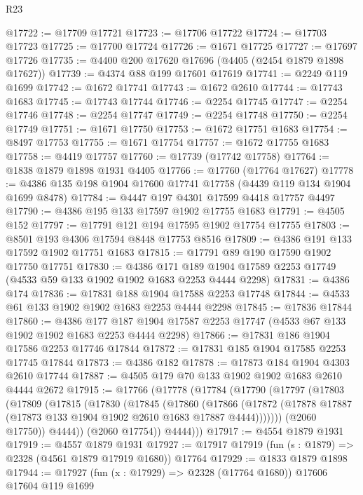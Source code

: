 \begin{lexlean}{R23}
\begin{coremodule}
@17722 := @17709 @17721
@17723 := @17706 @17722
@17724 := @17703 @17723
@17725 := @17700 @17724
@17726 := @1671 @17725
@17727 := @17697 @17726
@17735 := @4400 @200 @17620 @17696 (@4405 (@2454 @1879 @1898 @17627))
@17739 := @4374 @88 @199 @17601 @17619
@17741 := @2249 @119 @1699
@17742 := @1672 @17741
@17743 := @1672 @2610
@17744 := @17743 @1683
@17745 := @17743 @17744
@17746 := @2254 @17745
@17747 := @2254 @17746
@17748 := @2254 @17747
@17749 := @2254 @17748
@17750 := @2254 @17749
@17751 := @1671 @17750
@17753 := @1672 @17751 @1683
@17754 := @8497 @17753
@17755 := @1671 @17754
@17757 := @1672 @17755 @1683
@17758 := @4419 @17757
@17760 := @17739 (@17742 @17758)
@17764 := @1838 @1879 @1898 @1931 @4405
@17766 := @17760 (@17764 @17627)
@17778 := @4386 @135 @198 @1904 @17600 @17741 @17758 (@4439 @119 @134 @1904 @1699 @8478)
@17784 := @4447 @197 @4301 @17599 @4418 @17757 @4497
@17790 := @4386 @195 @133 @17597 @1902 @17755 @1683
@17791 := @4505 @152
@17797 := @17791 @121 @194 @17595 @1902 @17754 @17755
@17803 := @8501 @193 @4306 @17594 @8448 @17753 @8516
@17809 := @4386 @191 @133 @17592 @1902 @17751 @1683
@17815 := @17791 @89 @190 @17590 @1902 @17750 @17751
@17830 := @4386
    @171
    @189
    @1904
    @17589
    @2253
    @17749
    (@4533 @59 @133 @1902 @1902 @1683 @2253 @4444 @2298)
@17831 := @4386 @174
@17836 := @17831 @188 @1904 @17588 @2253 @17748
@17844 := @4533 @61 @133 @1902 @1902 @1683 @2253 @4444 @2298
@17845 := @17836 @17844
@17860 := @4386
    @177
    @187
    @1904
    @17587
    @2253
    @17747
    (@4533 @67 @133 @1902 @1902 @1683 @2253 @4444 @2298)
@17866 := @17831 @186 @1904 @17586 @2253 @17746 @17844
@17872 := @17831 @185 @1904 @17585 @2253 @17745 @17844
@17873 := @4386 @182
@17878 := @17873 @184 @1904 @4303 @2610 @17744
@17887 := @4505 @179 @70 @133 @1902 @1902 @1683 @2610 @4444 @2672
@17915 := @17766
    (@17778
      (@17784
        (@17790
          (@17797
            (@17803
              (@17809
                (@17815
                  (@17830
                    (@17845
                      (@17860
                        (@17866
                          (@17872
                            (@17878 @17887 (@17873 @133 @1904 @1902 @2610 @1683 @17887 @4444)))))))
                  (@2060 @17750))
                @4444))
            (@2060 @17754))
          @4444)))
@17917 := @4554 @1879 @1931
@17919 := @4557 @1879 @1931
@17927 := @17917 @17919 (fun (s : @1879) => @2328 (@4561 @1879 @17919 @1680)) @17764
@17929 := @1833 @1879 @1898
@17944 := @17927
    (fun (x : @17929) => @2328 (@17764 @1680))
    @17606
    @17604
    @119
    @1699

\end{coremodule}
\end{lexlean}
